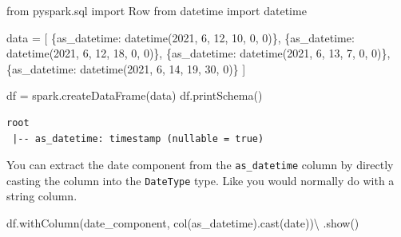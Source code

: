 \documentclass[
  11pt,
  letterpaper,
  DIV=11,
  numbers=noendperiod]{scrreprt}
\newenvironment{Shaded}{\begin{snugshade}}{\end{snugshade}}
\newcommand{\DecValTok}[1]{\textcolor[rgb]{0.68,0.00,0.00}{#1}}
\newcommand{\ImportTok}[1]{\textcolor[rgb]{0.00,0.46,0.62}{#1}}
\newcommand{\NormalTok}[1]{\textcolor[rgb]{0.00,0.23,0.31}{#1}}
\newcommand{\OperatorTok}[1]{\textcolor[rgb]{0.37,0.37,0.37}{#1}}
\newcommand{\StringTok}[1]{\textcolor[rgb]{0.13,0.47,0.30}{#1}}
\begin{document}
\begin{Shaded}
\begin{Highlighting}[]
\ImportTok{from}\NormalTok{ pyspark.sql }\ImportTok{import}\NormalTok{ Row}
\ImportTok{from}\NormalTok{ datetime }\ImportTok{import}\NormalTok{ datetime}

\NormalTok{data }\OperatorTok{=}\NormalTok{ [}
\NormalTok{    \{}\StringTok{\textquotesingle{}as\_datetime\textquotesingle{}}\NormalTok{: datetime(}\DecValTok{2021}\NormalTok{, }\DecValTok{6}\NormalTok{, }\DecValTok{12}\NormalTok{, }\DecValTok{10}\NormalTok{, }\DecValTok{0}\NormalTok{, }\DecValTok{0}\NormalTok{)\},}
\NormalTok{    \{}\StringTok{\textquotesingle{}as\_datetime\textquotesingle{}}\NormalTok{: datetime(}\DecValTok{2021}\NormalTok{, }\DecValTok{6}\NormalTok{, }\DecValTok{12}\NormalTok{, }\DecValTok{18}\NormalTok{, }\DecValTok{0}\NormalTok{, }\DecValTok{0}\NormalTok{)\},}
\NormalTok{    \{}\StringTok{\textquotesingle{}as\_datetime\textquotesingle{}}\NormalTok{: datetime(}\DecValTok{2021}\NormalTok{, }\DecValTok{6}\NormalTok{, }\DecValTok{13}\NormalTok{, }\DecValTok{7}\NormalTok{, }\DecValTok{0}\NormalTok{, }\DecValTok{0}\NormalTok{)\},}
\NormalTok{    \{}\StringTok{\textquotesingle{}as\_datetime\textquotesingle{}}\NormalTok{: datetime(}\DecValTok{2021}\NormalTok{, }\DecValTok{6}\NormalTok{, }\DecValTok{14}\NormalTok{, }\DecValTok{19}\NormalTok{, }\DecValTok{30}\NormalTok{, }\DecValTok{0}\NormalTok{)\}}
\NormalTok{]}

\NormalTok{df }\OperatorTok{=}\NormalTok{ spark.createDataFrame(data)}
\NormalTok{df.printSchema()}
\end{Highlighting}
\end{Shaded}

\begin{verbatim}
root
 |-- as_datetime: timestamp (nullable = true)
\end{verbatim}

You can extract the date component from the \texttt{as\_datetime} column
by directly casting the column into the \texttt{DateType} type. Like you
would normally do with a string column.

\begin{Shaded}
\begin{Highlighting}[]
\NormalTok{df.withColumn(}\StringTok{\textquotesingle{}date\_component\textquotesingle{}}\NormalTok{, col(}\StringTok{\textquotesingle{}as\_datetime\textquotesingle{}}\NormalTok{).cast(}\StringTok{\textquotesingle{}date\textquotesingle{}}\NormalTok{))}\OperatorTok{\textbackslash{}}
\NormalTok{    .show()}
\end{Highlighting}
\end{Shaded}
\end{document}
